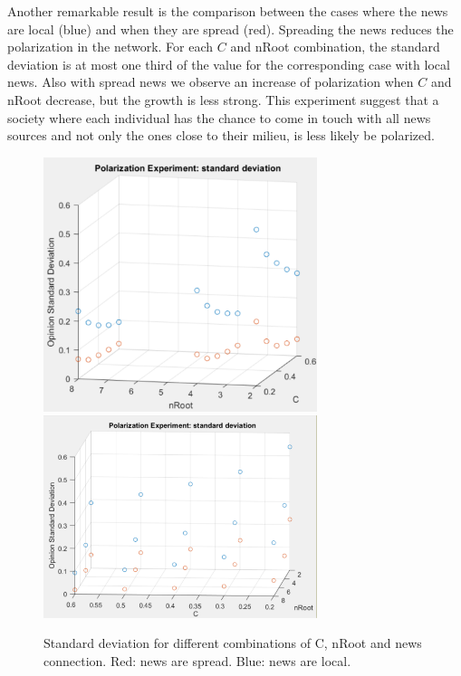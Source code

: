 Another remarkable result is the comparison between the cases where the news are local (blue) and when they are spread (red). Spreading the news reduces the polarization in the network. 
For each $C$ and nRoot combination, the standard deviation is at most one third of the value for the corresponding case with local news. Also with spread news we observe an increase of polarization when $C$ and nRoot decrease, but the growth is less strong. This experiment suggest that a society where each individual has the chance to come in touch with all news sources and not only the ones close to their milieu, is less likely be polarized.
\begin{figure}[!t]
\centering
\includegraphics[width=8cm]{Figures/pol_std1.png}
\includegraphics[width=8cm]{Figures/pol_std2.png}
\caption{Standard deviation for different combinations of C, nRoot and news connection. Red: news are spread. Blue: news are local.}
\label{pics:pol_std}
\end{figure}










